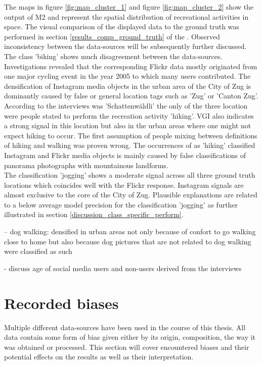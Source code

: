 The maps in figure \ref{fig:map_cluster_1} and figure \ref{fig:map_cluster_2} show the output of M2 and represent the spatial distribution of recreational activities in space. The visual comparison of the displayed data to the ground truth was performed in section \ref{results_comp_ground_truth} of the . Observed inconsistency between the data-sources will be subsequently further discussed. \\
The class 'biking' shows much disagreement between the data-sources. Investigations revealed that the corresponding Flickr data mostly originated from one major cycling event in the year 2005 to which many users contributed. The densification of Instagram media objects in the urban area of the City of Zug is dominantly caused by false or general location tags such as 'Zug' or 'Canton Zug'. \\
According to the interviews was 'Schattenw\"aldli' the only of the three location were people stated to perform the recreation activity 'hiking'. VGI also indicates a strong signal in this location but also in the urban areas where one might not expect hiking to occur. The first assumption of people mixing between definitions of hiking and walking was proven wrong. The occurrences of as 'hiking' classified Instagram and Flickr media objects is mainly caused by false classifications of panorama photographs with mountainous landforms. \\
The classification 'jogging' shows a moderate signal across all three ground truth locations which coincides well with the Flickr response. Instagram signals are almost exclusive to the core of the City of Zug. Plausible explanations are related to a below average model precision for the classification 'jogging' as further illustrated in section \ref{discussion_class_specific_perform}.  


    -- dog walking: densified in urban areas not only because of confort to go walking close to home but also because dog pictures that are not related to dog walking were classified as such

- discuss age of social media users and non-users derived from the interviews

\section{Recorded biases} \label{discussion_rec_bias}
Multiple different data-sources have been used in the course of this thesis. All data contain some form of bias given either by its origin, composition, the way it was obtained or processed. 
This section will cover encountered biases and their potential effects on the results as well as their interpretation.

